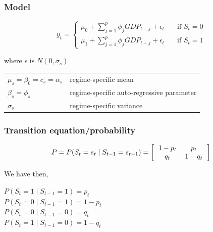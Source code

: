 \documentclass[12pt,a4paper,oneside]{book}
\begin{document}
\subsubsection{Model}




\begin{equation}
y_{t} =   
  \begin{cases}
    \mu_{0} + \sum^p_{j = 1} \phi_j GDP_{t-j} + \epsilon_t      & \quad \text{if } S_t = 0 \\
    \mu_{1} + \sum^p_{j = 1} \phi_j GDP_{t-j} + \epsilon_t      & \quad \text{if } S_t = 1
  \end{cases}
\end{equation}

where $\epsilon \text{ is } N(0,\sigma_s)$


\begin{tabular}{l l}
    $\mu_{s} = \beta_0 = c_s = \alpha_s $    & regime-specific mean    \\
    $\beta_{s} = \phi_s$ & regime-specific  auto-regressive parameter \\
    $\sigma_{s}$ & regime-specific variance    \\

\end{tabular}

\subsubsection{Transition equation/probability}

\begin{equation}
    P = P(S_t = s_t \mid S_{t-1} = s_{t-1}) = 
\left[ \begin{tabular}{c c}
            $1 - p_{t}$	& $p_{t}$ \\ 
            $q_{t}$	& $1 - q_{t}$ \\ 
\end{tabular} \right]
\end{equation}

We have then,

$P(S_t = 1 \mid S_{t-1} = 1) = p_t$   \\ 
$P(S_t = 0 \mid S_{t-1} = 1) = 1 - p_t$ \\
$P(S_t = 0 \mid S_{t-1} = 0) = q_t$   \\
$P(S_t = 1 \mid S_{t-1} = 0) = 1- q_t$ \\
\end{document}
